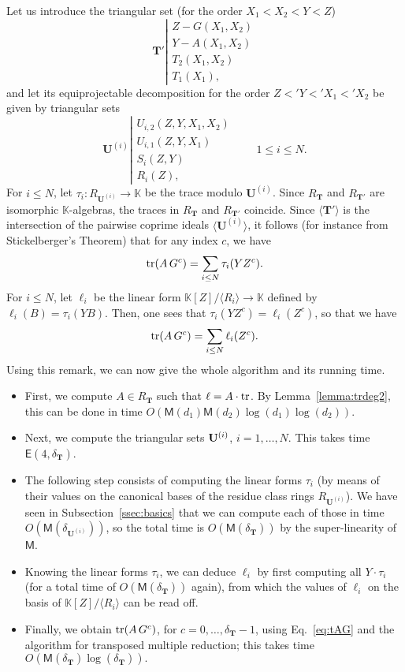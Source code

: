 \documentclass[12pt]{article}
\def\EE {\ensuremath{\mathsf{E}}}
\def\K {\ensuremath{\mathbb{K}}}
\def\M {\ensuremath{\mathsf{M}}}
\def\Tt {\ensuremath{\mathbf{T}}}
\def\Uu {\ensuremath{\mathbf{U}}}
\begin{document}
Let us introduce the triangular set (for the order $X_1<X_2<Y<Z$)
\[
\Tt' \left | 
  \begin{array}{l}
    Z-G(X_1,X_2)\\
    Y-A(X_1,X_2)\\
    T_2(X_1,X_2)\\
    T_1(X_1),
  \end{array}\right .
\]
and let its equiprojectable decomposition for the order $Z<'Y <' X_1
<' X_2$ be given by triangular sets
\[
\Uu^{(i)} \left | 
  \begin{array}{l}
    U_{i,2}(Z,Y,X_1,X_2)\\
    U_{i,1}(Z,Y,X_1)\\
    S_{i}(Z,Y)\\
    R_i(Z),
  \end{array}\right .\qquad 1 \le i \le N.
\]
For $i\le N$, let $\tau_i: R_{\Uu^{(i)}} \to \K$ be the trace modulo
$\Uu^{(i)}$. Since $R_\Tt$ and $R_{\Tt'}$ are isomorphic
$\K$-algebras, the traces in $R_\Tt$ and $R_{\Tt'}$ coincide.  Since
$\langle \Tt'\rangle$ is the intersection of the pairwise coprime
ideals $\langle \Uu^{(i)}\rangle$, it follows (for instance from
Stickelberger's Theorem) that for any index $c$, we have
$${\rm tr}(A\, G^{c}) = \sum_{i \le N} \tau_i(Y Z^{c}).$$ For $i \le
N$, let $\ell_i$ be the linear form $\K[Z]/\langle R_i \rangle \to \K$
defined by $\ell_i(B)=\tau_i(YB)$. Then, one sees that $\tau_i(Y
Z^{c})=\ell_i(Z^{c})$, so that we have
\begin{equation} \label{eq:tAG}
{\rm tr}(A\, G^{c}) = \sum_{i \le N}\ell_i(Z^c).  
\end{equation}
Using
this remark, we can now give the whole algorithm and its running time.
\begin{itemize}
\item First, we compute $A \in R_\Tt$ such that $\ell =A \cdot {\rm
  tr}$. By Lemma~\ref{lemma:trdeg2}, this can be done in time
  $O(\M(d_1)\M(d_2)\log(d_1)\log(d_2))$.
\item Next, we compute the triangular sets ${\bf U}^{(i)}$,
  $i=1,\dots,N$.  This takes time $\EE(4,\delta_\Tt)$.



\item The following step consists of computing the linear forms
  $\tau_i$ (by means of their values on the canonical bases of the
  residue class rings $R_{\Uu^{(i)}}$). We have seen in
  Subsection~\ref{ssec:basics} that we can compute each of those in
  time $O(\M(\delta_{\Uu^{(i)}}))$, so the total time is
  $O(\M(\delta_\Tt))$ by the super-linearity of $\M$.
\item Knowing the linear forms $\tau_i$, we can deduce $\ell_i$ by
  first computing all $Y\cdot \tau_i$ (for a total time of
  $O(\M(\delta_\Tt))$ again), from which the values of $\ell_i$ on the
  basis of $\K[Z]/\langle R_i \rangle$ can be read off.
\item Finally, we obtain ${\rm tr}(A\, G^{c})$, for
  $c=0,\dots,\delta_{\Tt}-1$, using Eq.~\eqref{eq:tAG} and the
  algorithm for transposed multiple reduction; this takes time
  $O(\M(\delta_\Tt) \log(\delta_\Tt)).$
\end{itemize}
\end{document}
